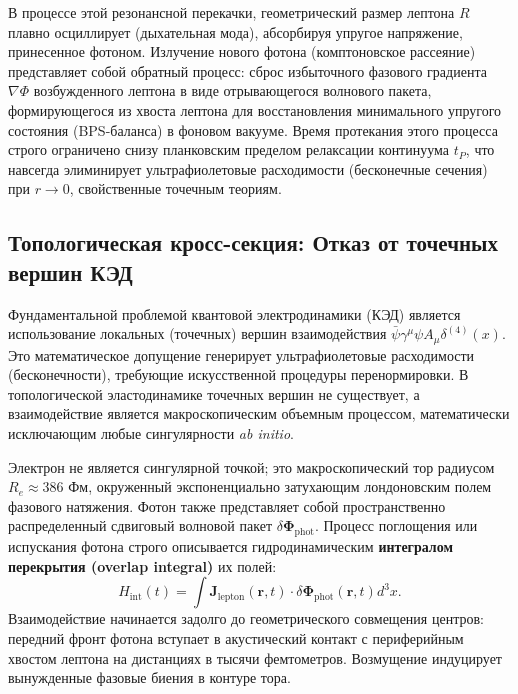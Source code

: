 \documentclass[11pt,a4paper]{article}
\begin{document}
	В процессе этой резонансной перекачки, геометрический размер лептона $R$ плавно осциллирует (дыхательная мода), абсорбируя упругое напряжение, принесенное фотоном. Излучение нового фотона (комптоновское рассеяние) представляет собой обратный процесс: сброс избыточного фазового градиента $\nabla \Phi$ возбужденного лептона в виде отрывающегося волнового пакета, формирующегося из хвоста лептона для восстановления минимального упругого состояния (BPS-баланса) в фоновом вакууме. Время протекания этого процесса строго ограничено снизу планковским пределом релаксации континуума $t_P$, что навсегда элиминирует ультрафиолетовые расходимости (бесконечные сечения) при $r \to 0$, свойственные точечным теориям.
	
	\subsection{Топологическая кросс-секция: Отказ от точечных вершин КЭД}
	Фундаментальной проблемой квантовой электродинамики (КЭД) является использование локальных (точечных) вершин взаимодействия $\bar{\psi}\gamma^\mu\psi A_\mu \delta^{(4)}(x)$. Это математическое допущение генерирует ультрафиолетовые расходимости (бесконечности), требующие искусственной процедуры перенормировки. В топологической эластодинамике точечных вершин не существует, а взаимодействие является макроскопическим объемным процессом, математически исключающим любые сингулярности \textit{ab initio}.
	
	Электрон не является сингулярной точкой; это макроскопический тор радиусом $R_e \approx 386$ Фм, окруженный экспоненциально затухающим лондоновским полем фазового натяжения. Фотон также представляет собой пространственно распределенный сдвиговый волновой пакет $\delta \mathbf{\Phi}_{\text{phot}}$. 
	Процесс поглощения или испускания фотона строго описывается гидродинамическим \textbf{интегралом перекрытия (overlap integral)} их полей:
	\begin{equation}
		H_{\text{int}}(t) = \int \mathbf{J}_{\text{lepton}}(\mathbf{r}, t) \cdot \delta \mathbf{\Phi}_{\text{phot}}(\mathbf{r}, t) d^3x.
	\end{equation}
	Взаимодействие начинается задолго до геометрического совмещения центров: передний фронт фотона вступает в акустический контакт с периферийным хвостом лептона на дистанциях в тысячи фемтометров. Возмущение индуцирует вынужденные фазовые биения в контуре тора.
	
\end{document}
